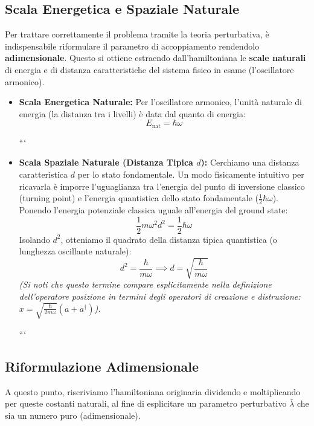\subsection{Scala Energetica e Spaziale Naturale}
Per trattare correttamente il problema tramite la teoria perturbativa, è indispensabile riformulare il parametro di accoppiamento rendendolo \textbf{adimensionale}. Questo si ottiene estraendo dall'hamiltoniana le \textbf{scale naturali} di energia e di distanza caratteristiche del sistema fisico in esame (l'oscillatore armonico).

\begin{itemize}
\item \textbf{Scala Energetica Naturale:} Per l'oscillatore armonico, l'unità naturale di energia (la distanza tra i livelli) è data dal quanto di energia:
\begin{equation}
E_{\text{nat}} = \hbar \omega
\end{equation}

```
\item \textbf{Scala Spaziale Naturale (Distanza Tipica $d$):} Cerchiamo una distanza caratteristica $d$ per lo stato fondamentale. Un modo fisicamente intuitivo per ricavarla è imporre l'uguaglianza tra l'energia del punto di inversione classico (turning point) e l'energia quantistica dello stato fondamentale ($\frac{1}{2} \hbar \omega$). Ponendo l'energia potenziale classica uguale all'energia del ground state:
\begin{equation}
    \frac{1}{2} m \omega^2 d^2 = \frac{1}{2} \hbar \omega
\end{equation}
Isolando $d^2$, otteniamo il quadrato della distanza tipica quantistica (o lunghezza oscillante naturale):
\begin{equation}
    d^2 = \frac{\hbar}{m \omega} \implies d = \sqrt{\frac{\hbar}{m \omega}}
\end{equation}
\textit{(Si noti che questo termine compare esplicitamente nella definizione dell'operatore posizione in termini degli operatori di creazione e distruzione: $x = \sqrt{\frac{\hbar}{2m\omega}}(a + a^\dagger)$).}

```

\end{itemize}

\subsection{Riformulazione Adimensionale}
A questo punto, riscriviamo l'hamiltoniana originaria dividendo e moltiplicando per queste costanti naturali, al fine di esplicitare un parametro perturbativo $\bar{\lambda}$ che sia un numero puro (adimensionale).

